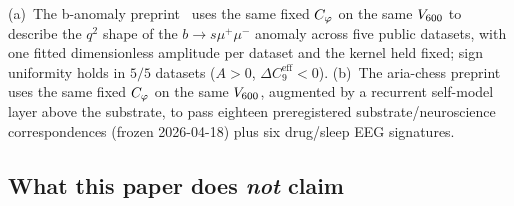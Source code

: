 \begin{enumerate}
  (a)~The b-anomaly preprint~\citep{SmartBAnomaly2026} uses the
  same fixed $C_{\varphi}$ on the same $V_{600}$ to describe the
  $q^{2}$ shape of the $b\to s\mu^{+}\mu^{-}$ anomaly across five
  public datasets, with one fitted dimensionless amplitude per
  dataset and the kernel held fixed; sign uniformity holds in
  $5/5$ datasets ($A>0$, $\Delta C_{9}^{\mathrm{eff}} < 0$).
  (b)~The aria-chess preprint~\citep{SmartAriaChess2026} uses the
  same fixed $C_{\varphi}$ on the same $V_{600}$, augmented by a
  recurrent self-model layer above the substrate, to pass eighteen
  preregistered substrate/neuroscience correspondences (frozen
  2026-04-18) plus six drug/sleep EEG signatures.
\end{enumerate}

\subsection*{What this paper does \emph{not} claim}


